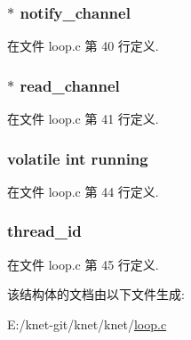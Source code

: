 \subsubsection[{notify\+\_\+channel}]{$\ast$ notify\+\_\+channel}\label{struct__loop__t_ae77337a149b2612ee5f36834d9a33426}


在文件 loop.\+c 第 40 行定义.

\hypertarget{struct__loop__t_ae2b416ad9f757f409c524301c77e4ce7}{}
\subsubsection[{read\+\_\+channel}]{$\ast$ read\+\_\+channel}\label{struct__loop__t_ae2b416ad9f757f409c524301c77e4ce7}


在文件 loop.\+c 第 41 行定义.

\hypertarget{struct__loop__t_af1f449cc09f8d36befcce07bc38c29c0}{}
\subsubsection[{running}]{\setlength{\rightskip}{0pt plus 5cm}volatile int running}\label{struct__loop__t_af1f449cc09f8d36befcce07bc38c29c0}


在文件 loop.\+c 第 44 行定义.

\hypertarget{struct__loop__t_a14d64ca2cf0317cc7821972647eb7b7a}{}
\subsubsection[{thread\+\_\+id}]{ thread\+\_\+id}\label{struct__loop__t_a14d64ca2cf0317cc7821972647eb7b7a}


在文件 loop.\+c 第 45 行定义.



该结构体的文档由以下文件生成\+:\begin{DoxyCompactItemize}
\item 
E\+:/knet-\/git/knet/knet/\hyperlink{loop_8c}{loop.\+c}\end{DoxyCompactItemize}
